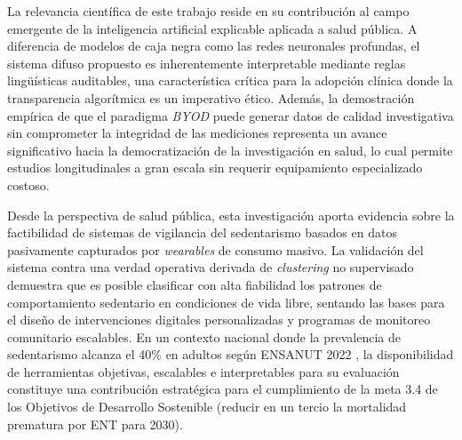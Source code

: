 La relevancia científica de este trabajo reside en su contribución al campo emergente de la inteligencia artificial explicable aplicada a salud pública. A diferencia de modelos de caja negra como las redes neuronales profundas, el sistema difuso propuesto es inherentemente interpretable mediante reglas lingüísticas auditables, una característica crítica para la adopción clínica donde la transparencia algorítmica es un imperativo ético. Además, la demostración empírica de que el paradigma \textit{BYOD} puede generar datos de calidad investigativa sin comprometer la integridad de las mediciones representa un avance significativo hacia la democratización de la investigación en salud, lo cual permite estudios longitudinales a gran escala sin requerir equipamiento especializado costoso.

Desde la perspectiva de salud pública, esta investigación aporta evidencia sobre la factibilidad de sistemas de vigilancia del sedentarismo basados en datos pasivamente capturados por \textit{wearables} de consumo masivo. La validación del sistema contra una verdad operativa derivada de \textit{clustering} no supervisado demuestra que es posible clasificar con alta fiabilidad los patrones de comportamiento sedentario en condiciones de vida libre, sentando las bases para el diseño de intervenciones digitales personalizadas y programas de monitoreo comunitario escalables. En un contexto nacional donde la prevalencia de sedentarismo alcanza el 40\% en adultos según ENSANUT 2022 \cite{Shamah-Levy2023ENSANUT}, la disponibilidad de herramientas objetivas, escalables e interpretables para su evaluación constituye una contribución estratégica para el cumplimiento de la meta 3.4 de los Objetivos de Desarrollo Sostenible (reducir en un tercio la mortalidad prematura por ENT para 2030).
